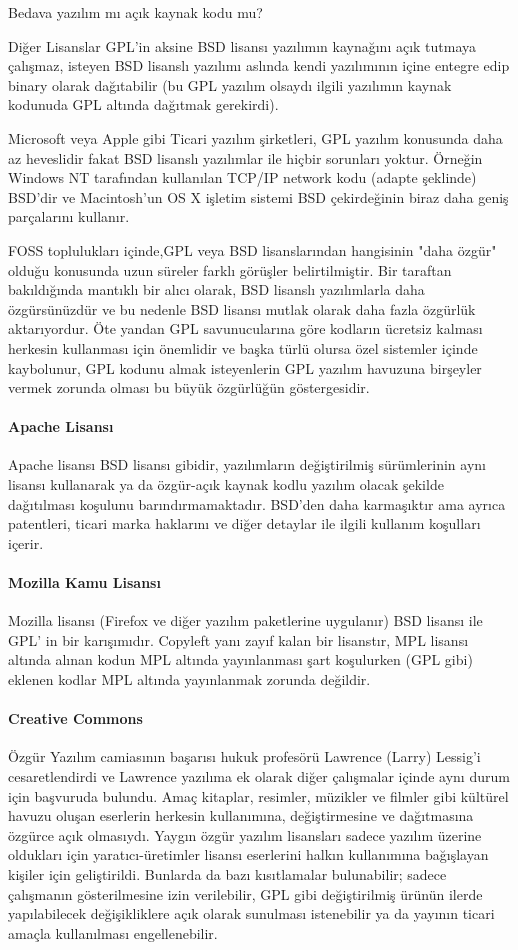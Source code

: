 \begin{section}{Bedava yazılım mı açık kaynak kodu mu?}
\begin{subsection}{Diğer Lisanslar}
GPL'in aksine BSD lisansı yazılımın kaynağını açık tutmaya çalışmaz, isteyen  BSD lisanslı yazılımı aslında kendi yazılımının içine entegre edip binary olarak dağıtabilir (bu GPL yazılım olsaydı ilgili yazılımın kaynak kodunuda GPL altında dağıtmak gerekirdi).

Microsoft veya Apple gibi Ticari yazılım şirketleri, GPL yazılım konusunda daha az heveslidir fakat BSD lisanslı yazılımlar  ile hiçbir sorunları yoktur. Örneğin Windows NT tarafından kullanılan TCP/IP network kodu (adapte şeklinde) BSD'dir ve Macintosh'un OS X işletim sistemi BSD çekirdeğinin biraz daha geniş parçalarını kullanır.

FOSS toplulukları içinde,GPL veya BSD lisanslarından hangisinin "daha özgür" olduğu konusunda uzun süreler farklı görüşler belirtilmiştir. Bir taraftan bakıldığında mantıklı bir alıcı olarak, BSD lisanslı yazılımlarla daha özgürsünüzdür ve bu nedenle BSD lisansı mutlak olarak daha fazla özgürlük aktarıyordur. Öte yandan GPL savunucularına göre kodların ücretsiz kalması herkesin kullanması için önemlidir ve başka türlü olursa özel sistemler içinde kaybolunur, GPL kodunu almak isteyenlerin GPL yazılım havuzuna birşeyler vermek zorunda olması bu büyük özgürlüğün göstergesidir.

\paragraph{Apache Lisansı}{Apache lisansı BSD lisansı gibidir, yazılımların değiştirilmiş sürümlerinin aynı lisansı kullanarak ya da özgür-açık kaynak kodlu yazılım olacak şekilde dağıtılması koşulunu barındırmamaktadır. BSD'den daha karmaşıktır ama ayrıca patentleri, ticari marka haklarını ve diğer detaylar ile ilgili kullanım koşulları içerir.}
\paragraph{Mozilla Kamu Lisansı}{Mozilla lisansı (Firefox ve diğer yazılım paketlerine uygulanır) BSD lisansı ile GPL' in bir karışımıdır. Copyleft yanı zayıf kalan bir lisanstır, MPL lisansı altında alınan kodun MPL altında yayınlanması şart koşulurken (GPL gibi) eklenen kodlar MPL altında yayınlanmak zorunda değildir.}
\paragraph{Creative Commons}{Özgür Yazılım camiasının başarısı hukuk profesörü Lawrence (Larry) Lessig'i cesaretlendirdi ve Lawrence yazılıma ek olarak diğer çalışmalar içinde aynı durum için başvuruda bulundu. Amaç kitaplar, resimler, müzikler ve filmler gibi kültürel havuzu oluşan eserlerin herkesin kullanımına, değiştirmesine ve dağıtmasına özgürce açık olmasıydı. Yaygın özgür yazılım lisansları sadece yazılım üzerine oldukları için yaratıcı-üretimler lisansı eserlerini halkın kullanımına bağışlayan kişiler için geliştirildi. Bunlarda da bazı kısıtlamalar bulunabilir; sadece çalışmanın gösterilmesine izin verilebilir, GPL gibi değiştirilmiş ürünün ilerde yapılabilecek değişikliklere açık olarak sunulması istenebilir ya da yayının ticari amaçla kullanılması engellenebilir.}

\end{subsection}
\end{section}
